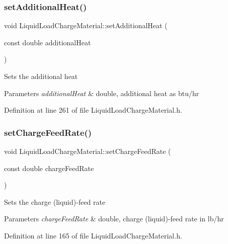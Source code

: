 \subsubsection{\texorpdfstring{set\+Additional\+Heat()}{setAdditionalHeat()}}
{\footnotesize\ttfamily void Liquid\+Load\+Charge\+Material\+::set\+Additional\+Heat (\begin{DoxyParamCaption}\item[{const double}]{additional\+Heat }\end{DoxyParamCaption})\hspace{0.3cm}{\ttfamily [inline]}}

Sets the additional heat 
\begin{DoxyParams}{Parameters}
{\em additional\+Heat} & double, additional heat as btu/hr \\
\hline
\end{DoxyParams}


Definition at line 261 of file Liquid\+Load\+Charge\+Material.\+h.

\mbox{\label{class_liquid_load_charge_material_a23d6aa6f15a124ddb1504261347b0b82}} 
\subsubsection{\texorpdfstring{set\+Charge\+Feed\+Rate()}{setChargeFeedRate()}}
{\footnotesize\ttfamily void Liquid\+Load\+Charge\+Material\+::set\+Charge\+Feed\+Rate (\begin{DoxyParamCaption}\item[{const double}]{charge\+Feed\+Rate }\end{DoxyParamCaption})\hspace{0.3cm}{\ttfamily [inline]}}

Sets the charge (liquid)-\/feed rate 
\begin{DoxyParams}{Parameters}
{\em charge\+Feed\+Rate} & double, charge (liquid)-\/feed rate in lb/hr \\
\hline
\end{DoxyParams}


Definition at line 165 of file Liquid\+Load\+Charge\+Material.\+h.

\mbox{\label{class_liquid_load_charge_material_a04ef0778e524f531b6dd2dd6137c270d}} 

